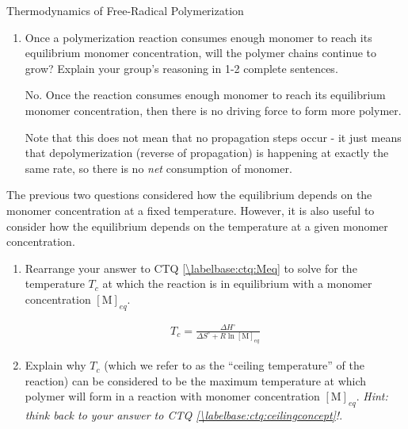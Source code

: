 \begin{activity}{Thermodynamics of Free-Radical Polymerization}
\begin{ctqs}
\begin{enumerate}
				\begin{solution}[1in]
					By Le Chatelier's principle, if $[\text{M}] > [\text{M}]_{eq}$, it is essentially like starting at equilibrium and adding excess monomer (a reagent).  This should push the reaction to the right and drive formation of polymer.
				\end{solution}
				
			\item Once a polymerization reaction consumes enough monomer to reach its equilibrium monomer concentration, will the polymer chains continue to grow?  Explain your group's reasoning in 1-2 complete sentences.
				
				\begin{solution}[1.5in]
					No. Once the reaction consumes enough monomer to reach its equilibrium monomer concentration, then there is no driving force to form more polymer.
					
					Note that this does not mean that no propagation steps occur - it just means that depolymerization (reverse of propagation) is happening at exactly the same rate, so there is no \emph{net} consumption of monomer.
				\end{solution}
				
		\end{enumerate}
	
	\question The previous two questions considered how the equilibrium depends on the monomer concentration at a fixed temperature. However, it is also useful to consider how the equilibrium depends on the temperature at a given monomer concentration.
	
		\begin{enumerate}
		
			\item Rearrange your answer to CTQ \ref{\labelbase:ctq:Meq} to solve for the temperature $T_c$ at which the reaction is in equilibrium with a monomer concentration $[\text{M}]_{eq}$.
				
				\begin{solution}[1in]
					\begin{align*}
						T_c = \frac{\Delta H^\circ}{\Delta S^\circ + R \ln [\text{M}]_{eq}}
					\end{align*}
				\end{solution}
				
			\item Explain why $T_c$ (which we refer to as the ``ceiling temperature'' of the reaction) can be considered to be the maximum temperature at which polymer will form in a reaction with monomer concentration $[\text{M}]_{eq}$. \emph{Hint: think back to your answer to CTQ \ref{\labelbase:ctq:ceilingconcept}!}.
				

\end{enumerate}
\end{ctqs}
\end{activity}
